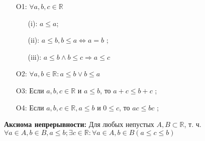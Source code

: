 \documentclass[12pt]{article}
\newcommand{\R}{\mathbb{R}}
\theoremstyle{definition}
\theoremstyle{definition}
\begin{document}
\begin{itemize}
    \item [O1: ] $\forall a, b, c \in \R$ 
        \begin{itemize}
            \item [(i): ] $a \leq a$;
            \item [(ii): ] $a \leq b, b \leq a \iff a = b$ ;
            \item [(iii): ]$ a \leq b \land b \leq c \Rightarrow a \leq c$
        \end{itemize}

    \item [O2: ] $\forall a, b \in \R \colon a \leq b \lor b \leq a$
    \item [O3: ] Если $a, b, c \in \R$ и $a \leq b$, то $a + c \leq b + c$ ;
    \item [O4: ] Если $a, b, c \in \R, a \leq b$ и $0 \leq c$, то $ac \leq bc$ ;
\end{itemize}

\textbf{Аксиома непрерывности: } Для любых непустых $A, B \subset \R$, т. ч. $\forall a \in A, b \in B, a \leq b; \exists c \in \R  \colon \forall a \in A, b \in B (a \leq c \leq b)$
\end{document}
